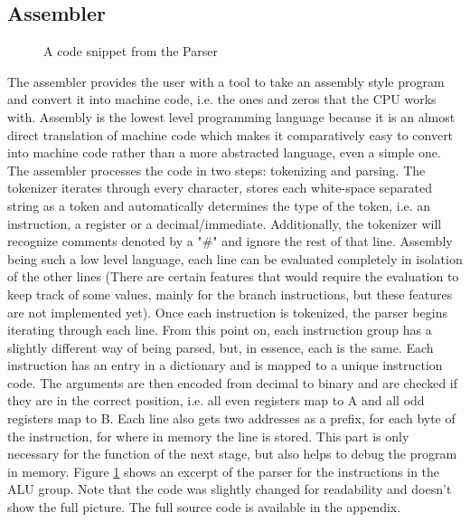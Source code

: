 \subsection{Assembler} \label{ssec::Assembler}
\begin{figure}[bp!]
    
    \caption[Parser code snippet]{A code snippet from the Parser}
    \label{fig::ParserSnippet}
\end{figure}
The assembler provides the user with a tool to take an assembly style program and convert it into machine code, i.e. the ones and zeros that the CPU works with. Assembly is the lowest level programming language because it is an almost direct translation of machine code which makes it comparatively easy to convert into machine code rather than a more abstracted language, even a simple one. The assembler processes the code in two steps: tokenizing and parsing. The tokenizer iterates through every character, stores each white-space separated string as a token and automatically determines the type of the token, i.e. an instruction, a register or a decimal/immediate. Additionally, the tokenizer will recognize comments denoted by a "\#" and ignore the rest of that line. Assembly being such a low level language, each line can be evaluated completely in isolation of the other lines (There are certain features that would require the evaluation to keep track of some values, mainly for the branch instructions, but these features are not implemented yet). Once each instruction is tokenized, the parser begins iterating through each line. From this point on, each instruction group has a slightly different way of being parsed, but, in essence, each is the same. Each instruction has an entry in a dictionary and is mapped to a unique instruction code. The arguments are then encoded from decimal to binary and are  checked if they are in the correct position, i.e. all even registers map to A and all odd registers map to B. Each line also gets two addresses as a prefix, for each byte of the instruction, for where in memory the line is stored. This part is only necessary for the function of the next stage, but also helps to debug the program in memory. Figure \ref{fig::ParserSnippet} shows an excerpt of the parser for the instructions in the ALU group. Note that the code was slightly changed for readability and doesn't show the full picture. The full source code is available in the appendix.

